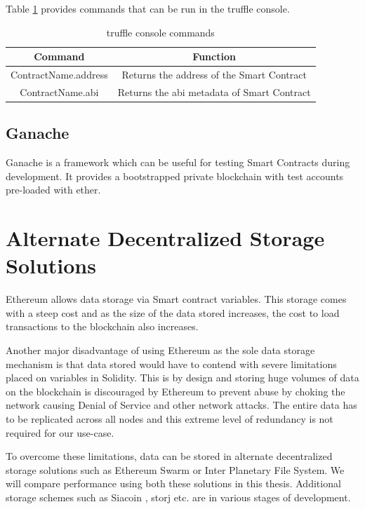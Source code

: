 \documentclass[11pt,openright]{report}
\begin{document}
Table \ref{truffle_console} provides commands that can be run in the truffle console.

\begin{table}[!htbp]
    \renewcommand{\arraystretch}{1.3}
    \caption{truffle console commands}
    \label{truffle_console}
    \centering
    \begin{tabular}{|c|c|}
        \hline
        \bfseries Command & \bfseries Function \\
        \hline\hline
        ContractName.address & Returns the address of the Smart Contract \\ \hline
        ContractName.abi & Returns the abi metadata of Smart Contract \\ \hline
    \end{tabular}
\end{table}


\subsection{Ganache}
Ganache is a framework which can be useful for testing Smart Contracts during development. It provides a bootstrapped private blockchain with test accounts pre-loaded with ether.

\section{Alternate Decentralized Storage Solutions}
Ethereum allows data storage via Smart contract variables. This storage comes with a steep cost and as the size of the data stored increases, the cost to load transactions to the blockchain also increases.

Another major disadvantage of using Ethereum as the sole data storage mechanism is that data stored would have to contend with severe limitations placed on variables in Solidity. This is by design and storing huge volumes of data on the blockchain is discouraged by Ethereum to prevent abuse by choking the network causing Denial of Service and other network attacks. The entire data has to be replicated across all nodes and this extreme level of redundancy is not required for our use-case.

To overcome these limitations, data can be stored in alternate decentralized storage solutions such as Ethereum Swarm or Inter Planetary File System. We will compare performance using both these solutions in this thesis. Additional storage schemes such as Siacoin \cite{vorick2014sia}, storj \cite{wilkinsonetal2014storj} etc. are in various stages of development.
\end{document}
